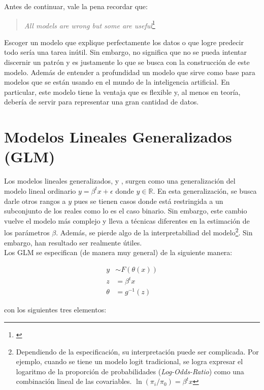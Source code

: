 \documentclass[../Main/Main.tex]{subfiles}
\begin{document}
Antes de continuar, vale la pena recordar que:
\begin{quote}
\textit{All models are wrong but some are useful}\footnote{\autocite{box1979robustnessinthe}}
\end{quote}

Escoger un modelo que explique perfectamente los datos o que logre predecir todo sería una tarea inútil. Sin embargo, no significa que no se pueda intentar discernir un patrón y es justamente lo que se busca con la construcción de este modelo. Además de entender a profundidad un modelo que sirve como base para modelos que se están usando en el mundo de la inteligencia artificial. En particular, este modelo tiene la ventaja que es flexible y, al menos en teoría, debería de servir para representar una gran cantidad de datos.

\section{Modelos Lineales Generalizados (GLM)} \label{sec:GLM}
Los modelos lineales generalizados, \autocite{sundberg2016exponential} y \autocite{maccullagh1989generalized}, surgen como una generalización del modelo lineal ordinario $y = \beta^tx + \epsilon$ donde $y \in\mathbb{R}$. En esta generalización, se busca darle otros rangos a $y$ pues se tienen casos donde está restringida a un subconjunto de los reales como lo es el caso binario. Sin embargo, este cambio vuelve el modelo más complejo y lleva a técnicas diferentes en la estimación de los parámetros $\beta$. Además, se pierde algo de la interpretabiliad del modelo\footnote{Dependiendo de la especificación, su interpretación puede ser complicada. Por ejemplo, cuando se tiene un modelo logit tradicional, se logra expresar el logaritmo de la proporción de probabilidades (\textit{Log-Odds-Ratio}) como una combinación lineal de las covariables. $\ln(\pi_i / \pi_0) = \beta^t x$}. Sin embargo, han resultado ser realmente útiles. \\

Los GLM se especifican (de manera muy general) de la siguiente manera:

\begin{align} 
	y &\sim F(\theta(x)) \label{ec:GLM} \\ 
	z &= \beta^tx \nonumber \\ 
	\theta &= g^{-1}(z) \nonumber
\end{align}

con los siguientes tres elementos:
\end{document}
